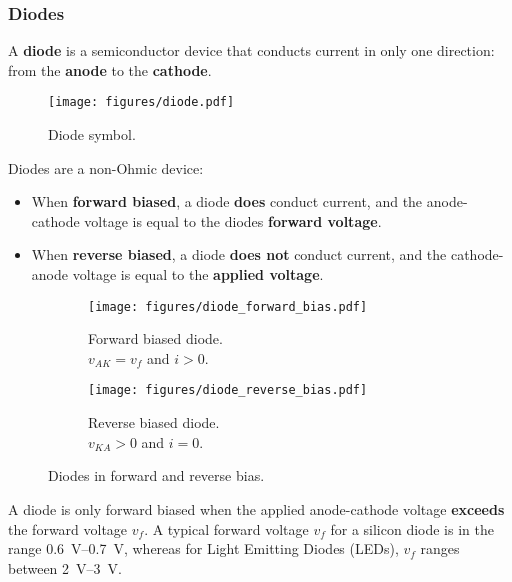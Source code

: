 \documentclass{article}
\begin{document}
\subsubsection{Diodes}
A \textbf{diode} is a semiconductor device that conducts current in
only one direction: from the \textbf{anode} to the \textbf{cathode}.
\begin{figure}[H]
    \centering
    \texttt{[image: figures/diode.pdf]}
    \caption{Diode symbol.} %
\end{figure}
Diodes are a non-Ohmic device:
\begin{itemize}
    \item When \textbf{forward biased}, a diode \textbf{does} conduct
          current, and the anode-cathode voltage is equal to the diodes
          \textbf{forward voltage}.
    \item When \textbf{reverse biased}, a diode \textbf{does not}
          conduct current, and the cathode-anode voltage is equal to
          the \textbf{applied voltage}.
\end{itemize}
\begin{figure}[H]
    \centering
    \begin{subfigure}{0.47\linewidth}
        \centering
        \texttt{[image: figures/diode\_forward\_bias.pdf]}
        \caption{Forward biased diode. \\\(v_{AK} = v_f\) and \(i > 0\).}
    \end{subfigure}
    \begin{subfigure}{0.47\linewidth}
        \centering
        \texttt{[image: figures/diode\_reverse\_bias.pdf]}
        \caption{Reverse biased diode. \\\(v_{KA} > 0\) and \(i = 0\).}
    \end{subfigure}
    \caption{Diodes in forward and reverse bias.}
\end{figure}
A diode is only forward biased when the applied anode-cathode voltage \textbf{exceeds} the forward voltage \(v_f\).
A typical forward voltage \(v_f\) for a silicon diode is in the range \qtyrange{0.6}{0.7}{V}, whereas for
Light Emitting Diodes (LEDs), \(v_f\) ranges between \qtyrange{2}{3}{V}.
\end{document}
